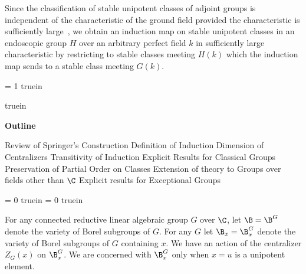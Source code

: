 Since the classification of stable unipotent classes of adjoint
groups is 
independent of the
characteristic of the ground field provided the characteristic is
sufficiently
large~\cite{C}, we
obtain an induction map on stable unipotent classes in an
endoscopic group
$H$ over an arbitrary perfect field $k$ in sufficiently large
characteristic 
by restricting
to stable classes meeting $H(k)$ which the induction map sends to
a stable 
class meeting $G(k)$.

\leftskip = 1 truein

 truein

\centerline{\bf Outline}

\bigskip

\noindent
{} Review of Springer's Construction\newline
{} Definition of Induction\newline
{} Dimension of Centralizers\newline
{} Transitivity of Induction\newline
{} Explicit Results for Classical
Groups\newline
{} Preservation of Partial Order on
Classes\newline
{} Extension of theory to Groups over fields
other than $\C$%
     \newline
{} Explicit results for Exceptional
Groups\newline

\leftskip = 0 truein
\rightskip = 0 truein
\newpage


\bigskip

For any connected reductive linear algebraic group $G$ over $\C$,
let 
$\B = \B^G$ denote the variety of Borel subgroups of $G$.  For
any $G$ let
$\B_x = \B_x^G$ denote the variety of Borel subgroups of $G$
containing $x$.
We have an action of the centralizer $Z_G(x)$ on $\B_x^G$.  We
are concerned
with $\B_x^G$ only when $x = u$ is a unipotent element.

